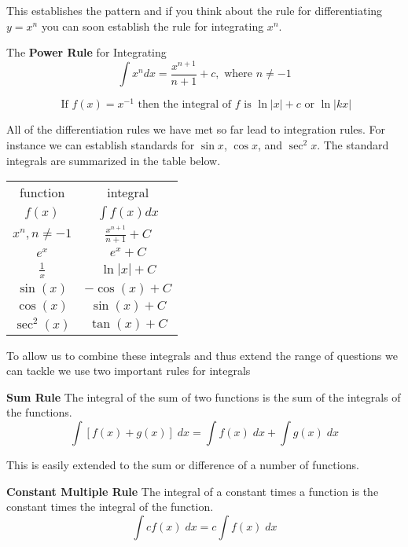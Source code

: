 \bigskip This establishes the pattern and if you think about the rule for differentiating $y =x^{n}$ you can soon establish the rule for integrating $x^{n}$.
\begin{tcolorbox}
	The \textbf{Power Rule} for Integrating
\[\int x^n dx = \frac{x^{n +1}}{n +1} +c, \text{ where }n \neq  -1
\]
\end{tcolorbox}


\begin{equation*}\text{ If }f (x) =x^{ -1}\text{ then the integral of }f\text{ is }\ln  \left \vert x\right \vert  +c\text{ or }\ln  \left \vert k x\right \vert
\end{equation*}



All of the differentiation rules we have met so far lead to integration rules. For instance we can establish standards for $\sin  x$, $\cos  x$, and $\sec ^{2} x\text{.}$ The standard integrals are summarized in the table below.
\begin{center}
	\begin{tabular}{cc}
		\toprule
		function&integral\\
		$f(x)$  &  $\int f(x)dx$ \\ \midrule
		$x^n, n \neq -1$ & $\frac{x^{n+1}}{n+1}+C$\\ \midrule
		$e^x$ & $e^x+C$\\ \midrule
		$\frac{1}{x}$ & $\ln|x|+C$\\ \midrule
		$\sin(x)$ & $-\cos(x)+C$ \\ \midrule
		$\cos(x)$ & $\sin(x)+C$ \\ \midrule
		$\sec^2(x)$ & $\tan(x)+C$ \\ \bottomrule
	\end{tabular}
\end{center}

To allow us to combine these integrals and thus extend the range of questions we can tackle we use two important rules for integrals 
\begin{tcolorbox}
\textbf{Sum Rule} The integral of the sum of two functions is the sum of the integrals of the functions.
\[\int \left [f (x) +g (x)\right ]\; d x =\int f (x)\; d x +\int g (x)\; d x\]
\end{tcolorbox}
This is easily extended to the sum or difference of a number of functions. 
\begin{tcolorbox}
\textbf{Constant Multiple Rule} The integral of a constant times a function is the constant times the integral of the function.
\[\int c f (x)\; d x =c \int f (x)\; d x
\]\end{tcolorbox}

